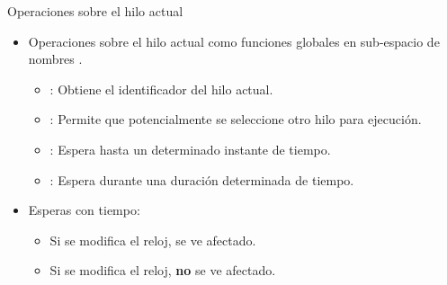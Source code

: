 \begin{frame}{Operaciones sobre el hilo actual}
\begin{itemize}
  \item Operaciones sobre el hilo actual como funciones globales en sub-espacio de nombres .
    \begin{itemize}
      \item {}: Obtiene el identificador del hilo actual.
      \item {}: Permite que potencialmente se seleccione otro hilo para ejecución.
      \item {}: Espera hasta un determinado instante de tiempo.
      \item {}: Espera durante una duración determinada de tiempo.
    \end{itemize}
  \item Esperas con tiempo:
    \begin{itemize}
      \item Si se modifica el reloj,  se ve afectado.
      \item Si se modifica el reloj,  \textbf{no} se ve afectado.
    \end{itemize}
\end{itemize}
\end{frame}
